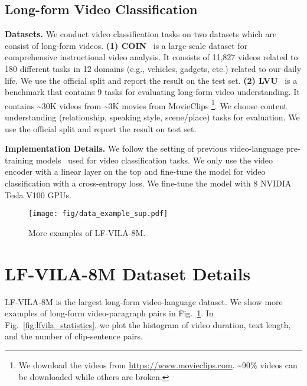 \documentclass{article}
\begin{document}
\subsection{Long-form Video Classification}
\textbf{Datasets.}
We conduct video classification tasks on two datasets which are consist of  long-form videos. \textbf{(1) COIN}~\cite{tang2019coin} is a large-scale dataset for comprehensive instructional video analysis. It consists of 11,827 videos related to 180 different tasks in 12 domains (e.g., vehicles, gadgets, etc.) related to our daily life. We use the official split and report the result on the test set.
\textbf{(2) LVU}~\cite{wu2021towards-longform} is a benchmark that contains 9 tasks
for evaluating long-form video understanding. It contains \textasciitilde30K videos from \textasciitilde3K movies from MovieClips \footnote{We download the videos from \url{https://www.movieclips.com}. \textasciitilde 90\% videos can be downloaded while others are broken.}. We choose content understanding (relationship, speaking style, scene/place) tasks for evaluation. We use the official split and report the result on test set.

\textbf{Implementation Details.}
We follow the setting of previous video-language pre-training models~\cite{lei2021clipbert,miech2020milnce,sun2019videobert,xu2021videoclip} used for video classification tasks. We only use the video encoder with a linear layer on the top and fine-tune the model for video classification with a cross-entropy loss. We fine-tune the model with 8 NVIDIA Tesla V100 GPUs. 

\begin{figure}[t]
    \centering
    \texttt{[image: fig/data\_example\_sup.pdf]}
    \caption{More examples of LF-VILA-8M.}
    \label{fig:lfvila_case}
\end{figure}

\section{LF-VILA-8M Dataset Details}\label{sec:app_dataset}

LF-VILA-8M is the largest long-form video-language dataset.
We show more examples of long-form video-paragraph pairs in Fig.~\ref{fig:lfvila_case}.
In Fig.~\ref{fig:lfvila_statistics}, we plot the histogram of video duration, text length, and the number of clip-sentence pairs. 
\end{document}
